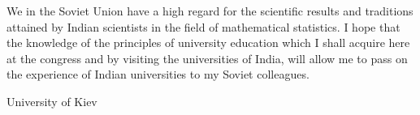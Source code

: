 We in the Soviet Union have a high regard for the scientific results
and traditions attained by Indian scientists in the field of
mathematical statistics. I hope that the knowledge of the principles
of university education which I shall acquire here at the congress and
by visiting the universities of India, will allow me to pass on the
experience of Indian universities to my Soviet colleagues.


\bigskip
\bigskip
{\fontsize{9pt}{11pt}\selectfont
University of Kiev}\relax


